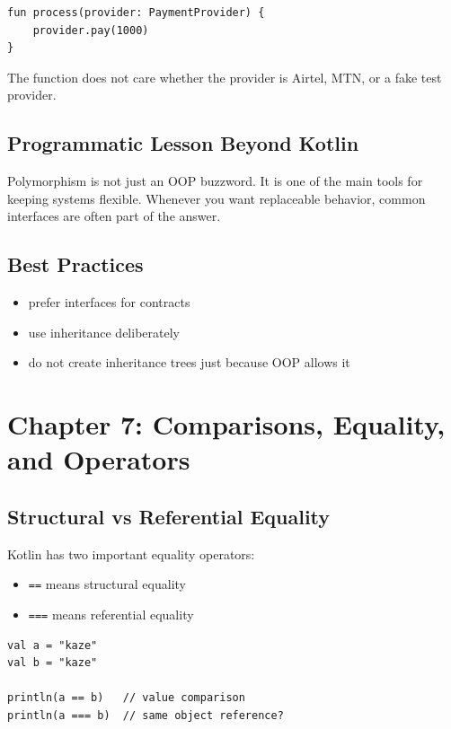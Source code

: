 \documentclass[11pt,a4paper]{article}
\begin{document}
\begin{lstlisting}[style=kazekotlin]
fun process(provider: PaymentProvider) {
    provider.pay(1000)
}
\end{lstlisting}

The function does not care whether the provider is Airtel, MTN, or a fake test provider.

\subsection{Programmatic Lesson Beyond Kotlin}

Polymorphism is not just an OOP buzzword. It is one of the main tools for keeping systems flexible. Whenever you want replaceable behavior, common interfaces are often part of the answer.

\subsection{Best Practices}

\begin{itemize}
    \item prefer interfaces for contracts
    \item use inheritance deliberately
    \item do not create inheritance trees just because OOP allows it
\end{itemize}

\section{Chapter 7: Comparisons, Equality, and Operators}

\subsection{Structural vs Referential Equality}

Kotlin has two important equality operators:
\begin{itemize}
    \item \texttt{==} means structural equality
    \item \texttt{===} means referential equality
\end{itemize}

\begin{lstlisting}[style=kazekotlin]
val a = "kaze"
val b = "kaze"

println(a == b)   // value comparison
println(a === b)  // same object reference?
\end{lstlisting}
\end{document}
